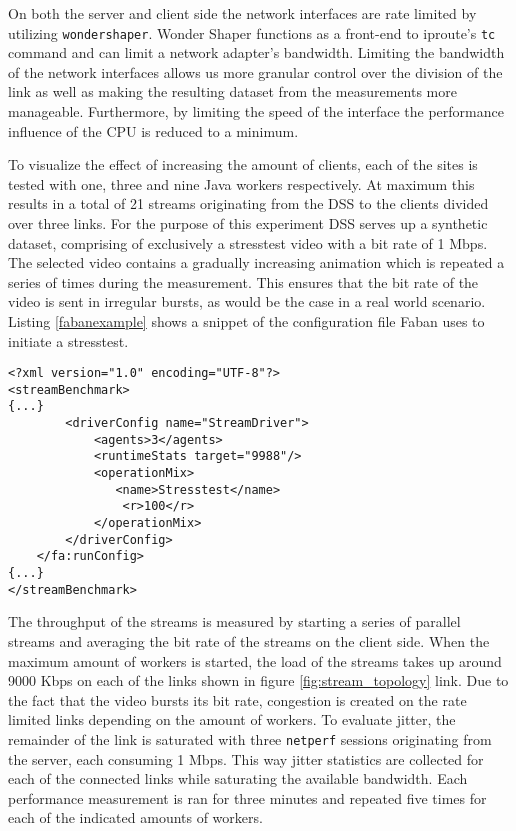 On both the server and client side the network interfaces are rate limited by utilizing \texttt{wondershaper}. Wonder Shaper functions as a front-end to iproute's \texttt{tc} command and can limit a network adapter's bandwidth. Limiting the bandwidth of the network interfaces allows us more granular control over the division of the link as well as making the resulting dataset from the measurements more manageable. Furthermore, by limiting the speed of the interface the performance influence of the CPU is reduced to a minimum. 

To visualize the effect of increasing the amount of clients, each of the sites is tested with one, three and nine Java workers respectively. At maximum this results in a total of 21 streams originating from the DSS to the clients divided over three links. For the purpose of this experiment DSS serves up a synthetic dataset, comprising of exclusively a stresstest video with a bit rate of 1 Mbps. The selected video contains a gradually increasing animation which is repeated a series of times during the measurement. This ensures that the bit rate of the video is sent in irregular bursts, as would be the case in a real world scenario. Listing \ref{fabanexample} shows a snippet of the configuration file Faban uses to initiate a  stresstest. 
\\
\begin{lstlisting}[caption={Faban driver configuration pointing to the stresstest operation},label=fabanexample]
<?xml version="1.0" encoding="UTF-8"?>
<streamBenchmark>
{...}
        <driverConfig name="StreamDriver">
            <agents>3</agents>
            <runtimeStats target="9988"/>
            <operationMix>
               <name>Stresstest</name>
                <r>100</r>
            </operationMix>
        </driverConfig>
    </fa:runConfig>
{...}
</streamBenchmark>
\end{lstlisting}
\noindent
The throughput of the streams is measured by starting a series of parallel streams and averaging the bit rate of the streams on the client side. When the maximum amount of workers is started, the load of the streams takes up around 9000 Kbps on each of the links shown in figure \ref{fig:stream_topology} link. Due to the fact that the video bursts its bit rate, congestion is created on the rate limited links depending on the amount of workers. To evaluate jitter, the remainder of the link is saturated with three \texttt{netperf} sessions originating from the server, each consuming 1 Mbps. This way jitter statistics are collected for each of the connected links while saturating the available bandwidth. Each performance measurement is ran for three minutes and repeated five times for each of the indicated amounts of workers. 
